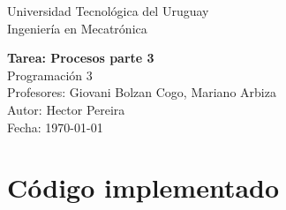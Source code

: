 \documentclass[11pt]{article}
\begin{document}
\begin{titlepage}
  \centering
  {\large Universidad Tecnológica del Uruguay \\[0.5cm]}
  {\large Ingeniería en Mecatrónica \\[2cm]}

  {\Huge \textbf{Tarea: Procesos parte 3}}\\[1cm]

  {\Large Programación 3}\\[0.5cm]
  {\Large Profesores: Giovani Bolzan Cogo, Mariano Arbiza}\\[1.5cm]

  \vfill
  {\large Autor: Hector Pereira}\\
  {\large Fecha: \today}
\end{titlepage}






\section{Código implementado}

\end{document}
